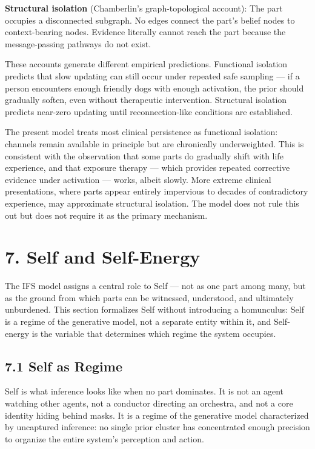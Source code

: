 \documentclass[11pt]{article}
\begin{document}
\textbf{Structural isolation} (Chamberlin's graph-topological account):
The part occupies a disconnected subgraph. No edges connect the part's
belief nodes to context-bearing nodes. Evidence literally cannot reach
the part because the message-passing pathways do not exist.

These accounts generate different empirical predictions. Functional
isolation predicts that slow updating can still occur under repeated
safe sampling --- if a person encounters enough friendly dogs with
enough activation, the prior should gradually soften, even without
therapeutic intervention. Structural isolation predicts near-zero
updating until reconnection-like conditions are established.

The present model treats most clinical persistence as functional
isolation: channels remain available in principle but are chronically
underweighted. This is consistent with the observation that some parts
do gradually shift with life experience, and that exposure therapy ---
which provides repeated corrective evidence under activation --- works,
albeit slowly. More extreme clinical presentations, where parts appear
entirely impervious to decades of contradictory experience, may
approximate structural isolation. The model does not rule this out but
does not require it as the primary mechanism.

\section{7. Self and Self-Energy}\label{self-and-self-energy}

The IFS model assigns a central role to Self --- not as one part among
many, but as the ground from which parts can be witnessed, understood,
and ultimately unburdened. This section formalizes Self without
introducing a homunculus: Self is a regime of the generative model, not
a separate entity within it, and Self-energy is the variable that
determines which regime the system occupies.

\subsection{7.1 Self as Regime}\label{self-as-regime}

Self is what inference looks like when no part dominates. It is not an
agent watching other agents, not a conductor directing an orchestra, and
not a core identity hiding behind masks. It is a regime of the
generative model characterized by uncaptured inference: no single prior
cluster has concentrated enough precision to organize the entire
system's perception and action.
\end{document}
